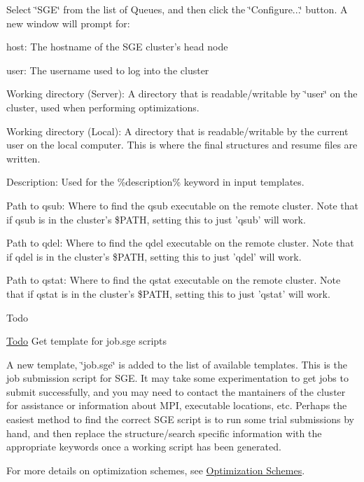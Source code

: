 Select \char`\"{}\-S\-G\-E\char`\"{} from the list of Queues, and then click the \char`\"{}\-Configure...\char`\"{} button. A new window will prompt for\-:
\begin{DoxyItemize}
\item host\-: The hostname of the S\-G\-E cluster's head node
\item user\-: The username used to log into the cluster
\item Working directory (Server)\-: A directory that is readable/writable by \char`\"{}user\char`\"{} on the cluster, used when performing optimizations.
\item Working directory (Local)\-: A directory that is readable/writable by the current user on the local computer. This is where the final structures and resume files are written.
\item Description\-: Used for the \%description\% keyword in input templates.
\item Path to qsub\-: Where to find the qsub executable on the remote cluster. Note that if qsub is in the cluster's \$\-P\-A\-T\-H, setting this to just 'qsub' will work.
\item Path to qdel\-: Where to find the qdel executable on the remote cluster. Note that if qdel is in the cluster's \$\-P\-A\-T\-H, setting this to just 'qdel' will work.
\item Path to qstat\-: Where to find the qstat executable on the remote cluster. Note that if qstat is in the cluster's \$\-P\-A\-T\-H, setting this to just 'qstat' will work.
\end{DoxyItemize}

\begin{DoxyRefDesc}{Todo}
\item[\hyperlink{todo__todo000002}{Todo}]Get template for job.\-sge scripts\end{DoxyRefDesc}


A new template, \char`\"{}job.\-sge\char`\"{} is added to the list of available templates. This is the job submission script for S\-G\-E. It may take some experimentation to get jobs to submit successfully, and you may need to contact the mantainers of the cluster for assistance or information about M\-P\-I, executable locations, etc. Perhaps the easiest method to find the correct S\-G\-E script is to run some trial submissions by hand, and then replace the structure/search specific information with the appropriate keywords once a working script has been generated.

For more details on optimization schemes, see \hyperlink{optschemes}{Optimization Schemes}.


